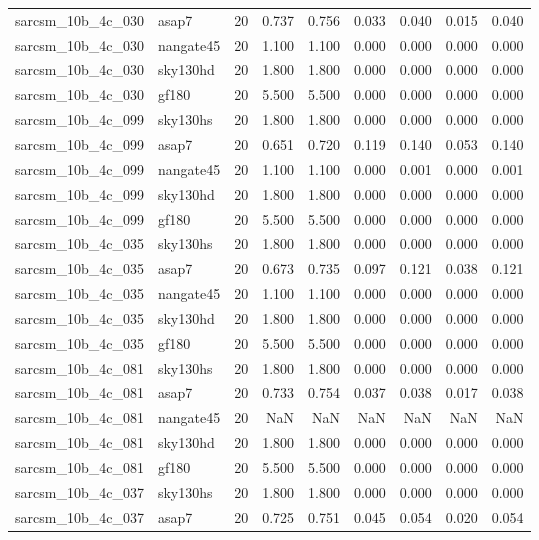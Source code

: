 \begin{tabular}{llrrrrrrr}
sarcsm\_10b\_4c\_030 & asap7 & 20 & 0.737 & 0.756 & 0.033 & 0.040 & 0.015 & 0.040 \\
sarcsm\_10b\_4c\_030 & nangate45 & 20 & 1.100 & 1.100 & 0.000 & 0.000 & 0.000 & 0.000 \\
sarcsm\_10b\_4c\_030 & sky130hd & 20 & 1.800 & 1.800 & 0.000 & 0.000 & 0.000 & 0.000 \\
sarcsm\_10b\_4c\_030 & gf180 & 20 & 5.500 & 5.500 & 0.000 & 0.000 & 0.000 & 0.000 \\
sarcsm\_10b\_4c\_099 & sky130hs & 20 & 1.800 & 1.800 & 0.000 & 0.000 & 0.000 & 0.000 \\
sarcsm\_10b\_4c\_099 & asap7 & 20 & 0.651 & 0.720 & 0.119 & 0.140 & 0.053 & 0.140 \\
sarcsm\_10b\_4c\_099 & nangate45 & 20 & 1.100 & 1.100 & 0.000 & 0.001 & 0.000 & 0.001 \\
sarcsm\_10b\_4c\_099 & sky130hd & 20 & 1.800 & 1.800 & 0.000 & 0.000 & 0.000 & 0.000 \\
sarcsm\_10b\_4c\_099 & gf180 & 20 & 5.500 & 5.500 & 0.000 & 0.000 & 0.000 & 0.000 \\
sarcsm\_10b\_4c\_035 & sky130hs & 20 & 1.800 & 1.800 & 0.000 & 0.000 & 0.000 & 0.000 \\
sarcsm\_10b\_4c\_035 & asap7 & 20 & 0.673 & 0.735 & 0.097 & 0.121 & 0.038 & 0.121 \\
sarcsm\_10b\_4c\_035 & nangate45 & 20 & 1.100 & 1.100 & 0.000 & 0.000 & 0.000 & 0.000 \\
sarcsm\_10b\_4c\_035 & sky130hd & 20 & 1.800 & 1.800 & 0.000 & 0.000 & 0.000 & 0.000 \\
sarcsm\_10b\_4c\_035 & gf180 & 20 & 5.500 & 5.500 & 0.000 & 0.000 & 0.000 & 0.000 \\
sarcsm\_10b\_4c\_081 & sky130hs & 20 & 1.800 & 1.800 & 0.000 & 0.000 & 0.000 & 0.000 \\
sarcsm\_10b\_4c\_081 & asap7 & 20 & 0.733 & 0.754 & 0.037 & 0.038 & 0.017 & 0.038 \\
sarcsm\_10b\_4c\_081 & nangate45 & 20 & NaN & NaN & NaN & NaN & NaN & NaN \\
sarcsm\_10b\_4c\_081 & sky130hd & 20 & 1.800 & 1.800 & 0.000 & 0.000 & 0.000 & 0.000 \\
sarcsm\_10b\_4c\_081 & gf180 & 20 & 5.500 & 5.500 & 0.000 & 0.000 & 0.000 & 0.000 \\
sarcsm\_10b\_4c\_037 & sky130hs & 20 & 1.800 & 1.800 & 0.000 & 0.000 & 0.000 & 0.000 \\
sarcsm\_10b\_4c\_037 & asap7 & 20 & 0.725 & 0.751 & 0.045 & 0.054 & 0.020 & 0.054 \\

\end{tabular}

